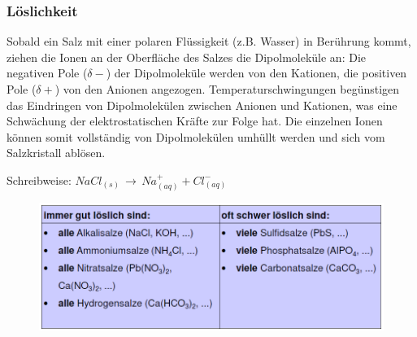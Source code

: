 \subsubsection{Löslichkeit}
Sobald ein Salz mit einer polaren Flüssigkeit (z.B. Wasser) in Berührung kommt, ziehen die Ionen an der Oberfläche des Salzes die Dipolmoleküle an: Die negativen Pole ($\delta-$) der Dipolmoleküle werden von den Kationen, die positiven Pole ($\delta+$) von den Anionen angezogen. Temperaturschwingungen begünstigen das Eindringen von Dipolmolekülen zwischen Anionen und Kationen, was eine Schwächung der elektrostatischen Kräfte zur Folge hat. Die einzelnen Ionen können somit vollständig von Dipolmolekülen umhüllt werden und sich vom Salzkristall ablösen.

Schreibweise: $NaCl_{(s)} \, \rightarrow \, Na^+_{(aq)} + Cl^-_{(aq)}$ \\

\begin{figure}[htbp]
	\centering
	\includegraphics[width=0.9\linewidth]{images/5_Tabelle_Loeslichkeit.png}
\end{figure}